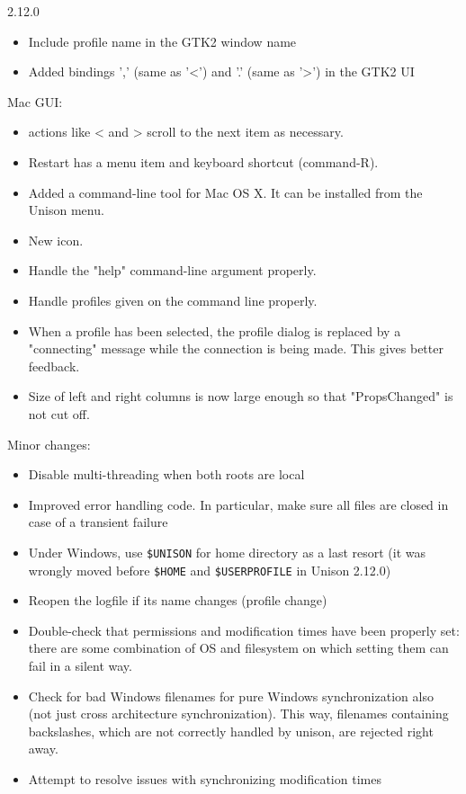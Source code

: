 \begin{changesfromversion}{2.12.0}
\begin{itemize}
\item Include profile name in the GTK2 window name
\item Added bindings ',' (same as '<') and '.' (same as '>') in the GTK2 UI
\end{itemize}
\item Mac GUI:
\begin{itemize}
\item actions like < and > scroll to the next item as necessary.
\item Restart has a menu item and keyboard shortcut (command-R).
\item
    Added a command-line tool for Mac OS X.  It can be installed from
    the Unison menu.
\item New icon.
\item   Handle the "help" command-line argument properly.
\item   Handle profiles given on the command line properly.
\item  When a profile has been selected, the profile dialog is replaced by a
    "connecting" message while the connection is being made.  This
    gives better feedback.
\item   Size of left and right columns is now large enough so that
    "PropsChanged" is not cut off.
\end{itemize}
\item Minor changes:
\begin{itemize}
\item Disable multi-threading when both roots are local
\item Improved error handling code.  In particular, make sure all files
  are closed in case of a transient failure
\item Under Windows, use \verb|$UNISON| for home directory as a last resort
  (it was wrongly moved before \verb|$HOME| and \verb|$USERPROFILE| in
  Unison 2.12.0)
\item Reopen the logfile if its name changes (profile change)
\item Double-check that permissions and modification times have been
  properly set: there are some combination of OS and filesystem on
  which setting them can fail in a silent way.
\item Check for bad Windows filenames for pure Windows synchronization
  also (not just cross architecture synchronization).
  This way, filenames containing backslashes, which are not correctly
  handled by unison, are rejected right away.
\item Attempt to resolve issues with synchronizing modification times

\end{itemize}
\end{changesfromversion}
